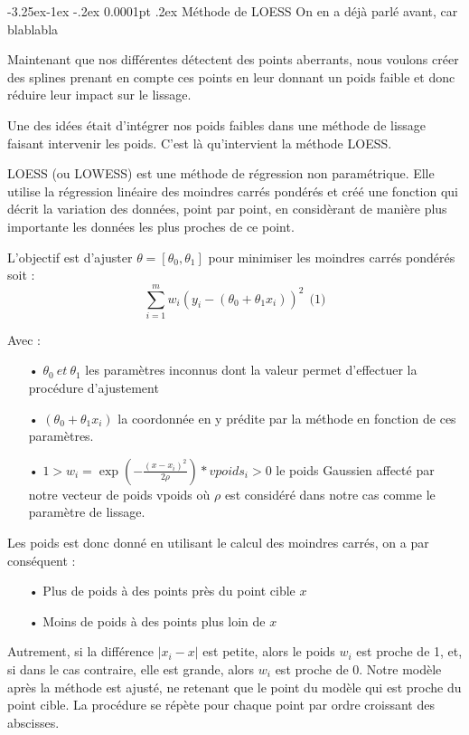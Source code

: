 \documentclass[a4paper,12pt]{article} %
\makeatletter
\renewcommand\paragraph{\@startsection{paragraph}{4}{\z@}%
                                      {-3.25ex\@plus -1ex \@minus -.2ex}%
                                      {0.0001pt \@plus .2ex}%
                                      {\normalfont\normalsize\bfseries}}
\makeatother
\begin{document}
                    
			    \paragraph{Méthode de LOESS}
			        On en a déjà parlé avant, car blablabla
			        
			        Maintenant que nos différentes détectent des points aberrants, nous voulons créer des splines prenant en compte ces points en leur donnant un poids faible et donc réduire leur impact sur le lissage.
                    
                    Une des idées était d'intégrer nos poids faibles dans une méthode de lissage faisant intervenir les poids. C'est là qu'intervient la méthode LOESS.
                    
                    LOESS (ou LOWESS) est une méthode de régression non paramétrique. Elle utilise la régression linéaire des moindres carrés pondérés et créé une fonction qui décrit la variation des données, point par point, en considèrant de manière plus importante les données les plus proches de ce point.
                    
                    L'objectif est d'ajuster $\theta = [\theta_0, \theta_1]$ pour minimiser les moindres carrés pondérés soit : \[\sum_{i=1}^m w_i ( y_i - (\theta_0 + \theta_1 x_i))^2 \ \ \text{(1)}\]
                    
                    Avec : 
                    \begin{itemize}
                        \item[•]  $\theta_0 \ et \ \theta_1$ les paramètres inconnus dont la valeur permet d'effectuer la procédure d'ajustement  
                        \item[•]  $(\theta_0 + \theta_1 x_i)$ la coordonnée en y prédite par la méthode en fonction de ces paramètres.
                        \item[•]  $1 > w_i = \exp \left( - \frac{(x -x_i)^2}{2 \rho} \right)*vpoids_i > 0$ le poids Gaussien affecté par notre vecteur de poids vpoids où  $\rho$ est considéré dans notre cas comme le paramètre de lissage.
                    \end{itemize}
                    
                    Les poids est donc donné en utilisant le calcul des moindres carrés, on a par conséquent :
                    \begin{itemize}
                        \item[•] Plus de poids à des points près du point cible $x$ 
                        \item[•] Moins de poids à des points plus loin de $x$
                    \end{itemize}
                    Autrement, si la différence $| x_i - x |$ est petite, alors le poids $w_i$ est proche de 1, et, si dans le cas contraire, elle est grande, alors $w_i$ est proche de 0. 
                    Notre modèle après la méthode est ajusté, ne retenant que le point du modèle qui est proche du point cible. La procédure se répète pour chaque point par ordre croissant des abscisses.
                    
\end{document}
